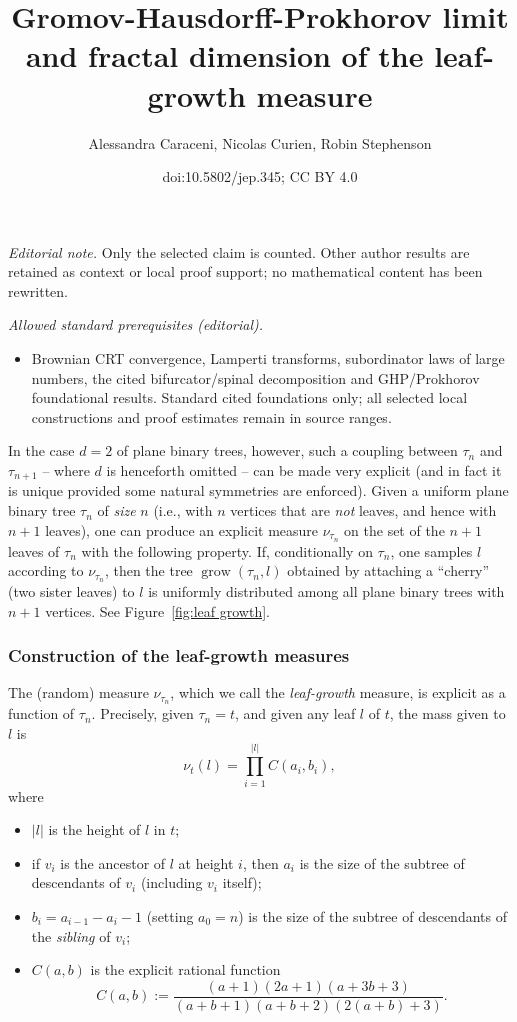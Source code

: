 \documentclass[11pt]{article}
\title{Gromov-Hausdorff-Prokhorov limit and fractal dimension of the leaf-growth measure}
\author{Alessandra Caraceni, Nicolas Curien, Robin Stephenson}
\date{doi:10.5802/jep.345; CC BY 4.0}
\theoremstyle{definition}
\begin{document}
\maketitle
\noindent\textit{Editorial note.} Only the selected claim is counted. Other author results are retained as context or local proof support; no mathematical content has been rewritten.\par\medskip
\noindent\textit{Allowed standard prerequisites (editorial).}\begin{itemize}
\item Brownian CRT convergence, Lamperti transforms, subordinator laws of large numbers, the cited bifurcator/spinal decomposition and GHP/Prokhorov foundational results. Standard cited foundations only; all selected local constructions and proof estimates remain in source ranges.
\end{itemize}\medskip
In the case $d=2$ of plane binary trees, however, such a coupling between $\tau_n$ and $\tau_{n+1}$ -- where $d$ is henceforth omitted -- can be made very explicit (and in fact it is unique provided some natural symmetries are enforced). Given a uniform plane binary tree $\tau_n$ of \emph{size} $n$ (i.e., with $n$ vertices that are \emph{not} leaves, and hence with $n+1$ leaves), one can produce an explicit measure $\nu_{\tau_n}$ on the set of the $n+1$ leaves of $\tau_n$ with the following property. If, conditionally on $\tau_n$, one samples $l$ according to $\nu_{\tau_n}$, then the tree $\operatorname{grow}(\tau_n,l)$ obtained by attaching a ``cherry'' (two sister leaves) to $l$ is uniformly distributed among all plane binary trees with $n+1$ vertices. See Figure~\ref{fig:leaf growth}.

\subsubsection*{Construction of the leaf-growth measures}

The (random) measure $\nu_{\tau_n}$, which we call the \emph{leaf-growth} measure, is explicit as a function of $\tau_n$. Precisely, given $\tau_n=t$, and given any leaf $l$ of $t$, the mass given to $l$ is
\begin{equation} \label{eq:nunavecproduct}\nu_t(l)=\prod_{i=1}^{|l|}C(a_i,b_i),
\end{equation}
where
\begin{itemize}
\item $|l|$ is the height of $l$ in $t$;
\item if $v_i$ is the ancestor of $l$ at height $i$, then $a_i$ is the size of the subtree of descendants of $v_i$ (including $v_i$ itself);
\item $b_i=a_{i-1}-a_{i}-1$ (setting $a_0=n$) is the size of the subtree of descendants of the \emph{sibling} of $v_i$;
\item $C(a,b)$ is the explicit rational function
\[
C(a,b) := \frac{(a+1)(2a+1)(a+3b+3)}{(a+b+1)(a+b+2)(2(a+b)+3)}.
\]
\end{itemize}
\end{document}
